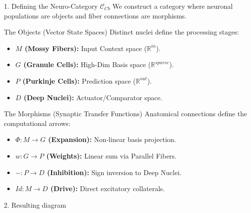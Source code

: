 \documentclass[10pt]{beamer}
\begin{document}
\begin{frame}{1. Defining the Neuro-Category $\mathcal{C}_{Cb}$}
	We construct a category where neuronal populations are objects and fiber connections are morphisms.
	
	\begin{block}{The Objects (Vector State Spaces)}
		Distinct nuclei define the processing stages:
		\begin{itemize}
			\item \textbf{$M$ (Mossy Fibers):} Input Context space ($\mathbb{R}^{in}$).
			\item \textbf{$G$ (Granule Cells):} High-Dim Basis space ($\mathbb{R}^{sparse}$).
			\item \textbf{$P$ (Purkinje Cells):} Prediction space ($\mathbb{R}^{out}$).
			\item \textbf{$D$ (Deep Nuclei):} Actuator/Comparator space.
		\end{itemize}
	\end{block}
	
	\begin{block}{The Morphisms (Synaptic Transfer Functions)}
		Anatomical connections define the computational arrows:
		\begin{itemize}
			\item \textbf{$\Phi: M \to G$ (Expansion):} Non-linear basis projection.
			\item \textbf{$w: G \to P$ (Weights):} Linear sum via Parallel Fibers.
			\item \textbf{$-: P \to D$ (Inhibition):} Sign inversion to Deep Nuclei.
			\item \textbf{$Id: M \to D$ (Drive):} Direct excitatory collaterals.
		\end{itemize}
	\end{block}
\end{frame}

\begin{frame}{2. Resulting diagram}
	\begin{center}
	\end{center}
\end{frame}
\end{document}
